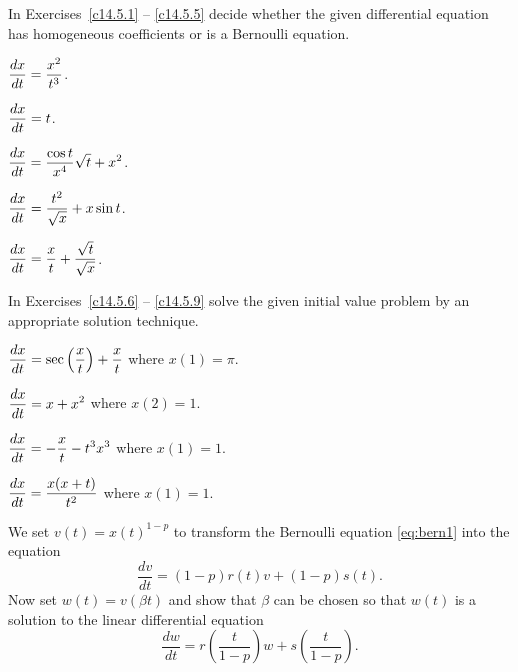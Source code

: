 \documentclass{ximera}
\begin{document}
\EXER

\TEXER

\noindent In Exercises~\ref{c14.5.1} -- \ref{c14.5.5} decide whether the 
given differential equation has homogeneous coefficients or is a Bernoulli 
equation.
\begin{exercise} \label{c14.5.1}
$\displaystyle \frac{dx}{dt} = \frac{x^2}{t^3}$.
\end{exercise}
\begin{exercise} \label{c14.5.2}
$\displaystyle \frac{dx}{dt} = t$.
\end{exercise}
\begin{exercise} \label{c14.5.4}
$\displaystyle \frac{dx}{dt} = \frac{\cos t}{x^4}\sqrt{t}+x^2$.
\end{exercise}
\begin{exercise} \label{c14.5.3}
$\displaystyle \frac{dx}{dt} = \frac{t^2}{\sqrt{x}}+x\sin t$.
\end{exercise}
\begin{exercise} \label{c14.5.5}
$\displaystyle \frac{dx}{dt} = \frac{x}{t} +\frac{\sqrt{t}}{\sqrt{x}}$.
\end{exercise}

\noindent In Exercises~\ref{c14.5.6} -- \ref{c14.5.9} solve the given initial 
value problem by an appropriate solution technique.
\begin{exercise} \label{c14.5.6}
$\displaystyle \frac{dx}{dt} = \sec\left(\frac{x}{t}\right)+\frac{x}{t}$ where
$x(1)=\pi$.
\end{exercise}
\begin{exercise} \label{c14.5.7}
$\displaystyle \frac{dx}{dt} = x+x^2$ where $x(2)=1$.
\end{exercise}
\begin{exercise} \label{c14.5.8}
$\displaystyle \frac{dx}{dt} = -\frac{x}{t}-t^3 x^3$ where $x(1)=1$.
\end{exercise}
\begin{exercise} \label{c14.5.9}
$\displaystyle \frac{dx}{dt} = \frac{x(x+t)}{t^2}$ where $x(1)=1$.
\end{exercise}

\begin{exercise} \label{c14.5.10}
We set $v(t) = x(t)^{1-p}$ to transform the Bernoulli equation 
\eqref{eq:bern1} into the equation
\[
\frac{dv}{dt} = (1-p) r(t) v + (1-p) s(t).
\]
Now set $w(t) = v(\beta t)$ and show that $\beta$ can be chosen so that 
$w(t)$ is a solution to the linear differential equation
\[
\frac{dw}{dt} = r\left(\frac{t}{1-p}\right) w + s\left(\frac{t}{1-p}\right).
\]
\end{exercise}
\end{document}
